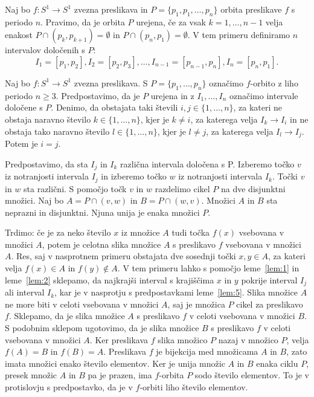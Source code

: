 \documentclass[../TG_magistrsko_delo_sections.tex]{subfiles}
\begin{document}
\begin{definicija}
Naj bo $f\colon S^1 \to S^1$ zvezna preslikava in $P =\{p_1, p_1, \dots, p_n \}$ orbita preslikave $f$ s periodo $n$. Pravimo, da je orbita $P$ urejena, če za vsak $k=1, \dots, n-1$ velja enakost $P \cap (p_k, p_{k+1}) = \emptyset$ in $P \cap (p_n, p_1) = \emptyset$. V tem primeru definiramo $n$ intervalov določenih s $P$:
$$I_1 = [p_1, p_2], I_2 = [p_2, p_3], \dots, I_{n-1} = [p_{n-1}, p_n], I_n = [p_n, p_1].$$
\end{definicija}

\begin{lema}\label{lem:5}					%
Naj bo $f \colon S^1 \to S^1$ zvezna preslikava. S $P=\{p_1, \dots, p_n\}$ označimo $f$-orbito z liho periodo $n \geq 3$. Predpostavimo, da je $P$ urejena in z $I_1, \dots, I_n$ označimo intervale določene s $P$. Denimo, da obstajata taki števili $i, j \in \{1, \dots, n \}$, za kateri ne obstaja naravno število $k \in \{1, \dots, n\}$, kjer je $k \neq i$, za katerega velja $I_k \to I_i$ in ne obstaja tako naravno število $l \in \{1, \dots, n\}$, kjer je $l \neq j$, za katerega velja $I_l \to I_j$. Potem je $i=j$.
\end{lema}

\begin{dokaz}
Predpostavimo, da sta $I_j$ in $I_k$ različna intervala določena s P. Izberemo točko $v$ iz notranjosti intervala $I_j$ in izberemo točko $w$ iz notranjosti intervala $I_k$. Točki $v$ in $w$ sta različni. S pomočjo točk $v$ in $w$ razdelimo cikel $P$ na dve disjunktni množici. Naj bo $A = P \cap (v, w)$ in $B = P \cap (w, v)$. Množici $A$ in $B$ sta neprazni in disjunktni. Njuna unija je enaka množici $P$.

Trdimo: če je za neko število $x$ iz množice $A$ tudi točka $f(x)$ vsebovana v množici $A$, potem je celotna slika množice $A$ s preslikavo $f$ vsebovana v množici $A$. Res, saj v nasprotnem primeru obstajata dve sosednji točki $x, y \in A$, za kateri velja $f(x) \in A$ in $f(y) \notin A$. V tem primeru lahko s pomočjo leme~\ref{lem:1} in leme~\ref{lem:2} sklepamo, da najkrajši interval s krajiščima $x$ in $y$ pokrije interval $I_j$ ali interval $I_k$, kar je v nasprotju s predpostavkami leme~\ref{lem:5}. Slika množice $A$ ne more biti v celoti vsebovana v množici $A$, saj je množica $P$ cikel za preslikavo $f$. Sklepamo, da je slika množice $A$ s preslikavo $f$ v celoti vsebovana v množici $B$. S podobnim sklepom ugotovimo, da je slika množice $B$ s preslikavo $f$ v celoti vsebovana v množici $A$. Ker preslikava $f$ slika množico $P$ nazaj v množico $P$, velja $f(A) = B$ in $f(B) = A$. Preslikava $f$ je bijekcija med množicama $A$ in $B$, zato imata množici enako število elementov. Ker je unija množic $A$ in $B$ enaka ciklu $P$, presek množic $A$ in $B$ pa je prazen, ima $f$-orbita $P$ sodo število elementov. To je v protislovju s predpostavko, da je v $f$-orbiti liho število elementov.
\end{dokaz}
\end{document}
